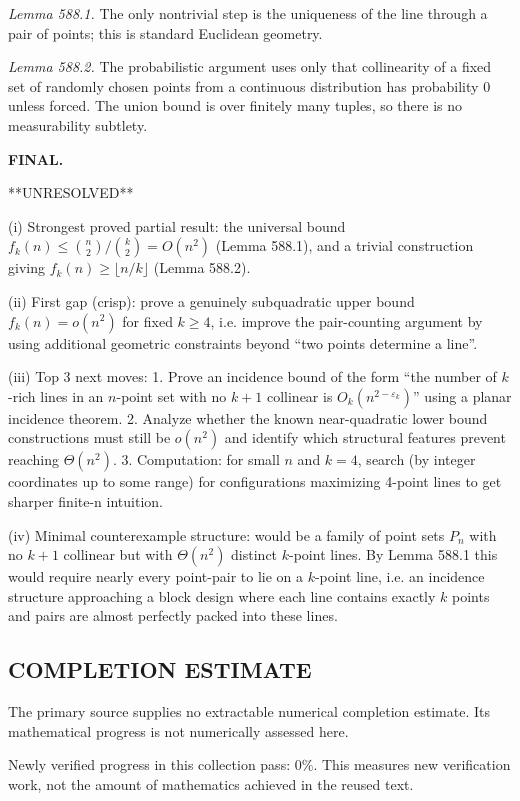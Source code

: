 \emph{Lemma 588.1.} The only nontrivial step is the uniqueness of the line through a pair of points; this is standard Euclidean geometry.

\emph{Lemma 588.2.} The probabilistic argument uses only that collinearity of a fixed set of randomly chosen points from a continuous distribution has probability $0$ unless forced. The union bound is over finitely many tuples, so there is no measurability subtlety.

\bigskip
\noindent\textbf{FINAL.}

**UNRESOLVED**

(i) Strongest proved partial result: the universal bound $f_k(n)\le \binom{n}{2}/\binom{k}{2}=O(n^2)$ (Lemma 588.1), and a trivial construction giving $f_k(n)\ge\lfloor n/k\rfloor$ (Lemma 588.2).

(ii) First gap (crisp): prove a genuinely subquadratic upper bound $f_k(n)=o(n^2)$ for fixed $k\ge 4$, i.e. improve the pair-counting argument by using additional geometric constraints beyond ``two points determine a line''.

(iii) Top 3 next moves:
1. Prove an incidence bound of the form ``the number of $k$-rich lines in an $n$-point set with no $k+1$ collinear is $O_k(n^{2-\varepsilon_k})$'' using a planar incidence theorem.
2. Analyze whether the known near-quadratic lower bound constructions must still be $o(n^2)$ and identify which structural features prevent reaching $\Theta(n^2)$.
3. Computation: for small $n$ and $k=4$, search (by integer coordinates up to some range) for configurations maximizing 4-point lines to get sharper finite-n intuition.

(iv) Minimal counterexample structure: would be a family of point sets $P_n$ with no $k+1$ collinear but with $\Theta(n^2)$ distinct $k$-point lines. By Lemma 588.1 this would require nearly every point-pair to lie on a $k$-point line, i.e. an incidence structure approaching a block design where each line contains exactly $k$ points and pairs are almost perfectly packed into these lines.




\subsection*{COMPLETION ESTIMATE}
The primary source supplies no extractable numerical completion estimate. Its mathematical progress is not numerically assessed here.

Newly verified progress in this collection pass: $0\%$. This measures new verification work, not the amount of mathematics achieved in the reused text.
